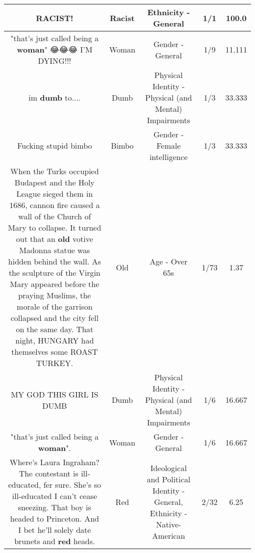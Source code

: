 \documentclass[11pt]{article}
\newlength\mylength
\begin{document}
\begin{center}
\begin{longtable}{|C{.65\mylength}|C{.30\mylength}|C{.12\mylength}|C{.12\mylength}|C{.12\mylength}|}
  \small RACIST!\normalsize   & Racist & Ethnicity - General & 1/1 & 100.0 \\  \hline
  \small "that's just called being a \textbf{woman}" 😂😂😂 I'M DYING!!!\normalsize   & Woman & Gender - General & 1/9 & 11.111 \\  \hline
  \small im \textbf{dumb} to....\normalsize   & Dumb & Physical Identity - Physical (and Mental) Impairments & 1/3 & 33.333 \\  \hline
  \small Fucking stupid bimbo\normalsize   & Bimbo & Gender - Female intelligence & 1/3 & 33.333 \\  \hline
  \small When the Turks occupied Budapest and the Holy League sieged them in 1686, cannon fire caused a wall of the Church of Mary to collapse. It turned out that an \textbf{old} votive Madonna statue was hidden behind the wall. As the sculpture of the Virgin Mary appeared before the praying Muslims, the morale of the garrison collapsed and the city fell on the same day. That night, HUNGARY had themselves some ROAST TURKEY.\normalsize   & Old & Age - Over 65s & 1/73 & 1.37 \\  \hline
  \small MY GOD THIS GIRL IS DUMB\normalsize   & Dumb & Physical Identity - Physical (and Mental) Impairments & 1/6 & 16.667 \\  \hline
  \small "that's just called being a \textbf{woman}".\normalsize   & Woman & Gender - General & 1/6 & 16.667 \\  \hline
  \small Where's Laura Ingraham? The contestant is ill-educated, fer sure. She's so ill-educated I can't cease sneezing. That boy is headed to Princeton. And I bet he'll solely date brunets and \textbf{r\textbf{ed}} heads.\normalsize   & Red &  Ideological and Political Identity - General, Ethnicity - Native-American & 2/32 & 6.25 \\  \hline

\end{longtable}
\end{center}
\end{document}
